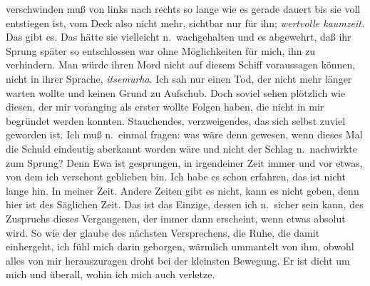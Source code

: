 \documentclass[
]{article}
\begin{document}
verschwinden muß von links nach rechts so lange wie es gerade dauert bis
sie voll entstiegen ist, vom Deck also nicht mehr, sichtbar nur für ihn;
\emph{wertvolle kaumzeit. }Das gibt es. Das hätte sie vielleicht
n.~wachgehalten und es abgewehrt, daß ihr Sprung später so entschlossen
war ohne Möglichkeiten für mich, ihn zu verhindern. Man würde ihren Mord
nicht auf diesem Schiff voraussagen können, nicht in ihrer Sprache,
\emph{itsemurha}. Ich sah nur einen Tod, der nicht mehr länger warten
wollte und keinen Grund zu Aufschub. Doch soviel sehen plötzlich wie
diesen, der mir voranging als erster wollte Folgen haben, die nicht in
mir begründet werden konnten. Stauchendes, verzweigendes, das sich
selbst zuviel geworden ist. Ich muß n.~einmal fragen: was wäre denn
gewesen, wenn dieses Mal die Schuld eindeutig aberkannt worden wäre und
nicht der Schlag n.~nachwirkte zum Sprung? Denn Ewa ist gesprungen, in
irgendeiner Zeit immer und vor etwas, von dem ich verschont geblieben
bin. Ich habe es schon erfahren, das ist nicht lange hin. In meiner
Zeit. Andere Zeiten gibt es nicht, kann es nicht geben, denn hier ist
des Säglichen Zeit. Das ist das Einzige, dessen ich n.~sicher sein kann,
des Zuspruchs dieses Vergangenen, der immer dann erscheint, wenn etwas
absolut wird. So wie der glaube des nächsten Versprechens, die Ruhe, die
damit einhergeht, ich fühl mich darin geborgen, wärmlich ummantelt von
ihm, obwohl alles von mir herauszuragen droht bei der kleinsten
Bewegung. Er ist dicht um mich und überall, wohin ich mich auch
verletze.
\end{document}
